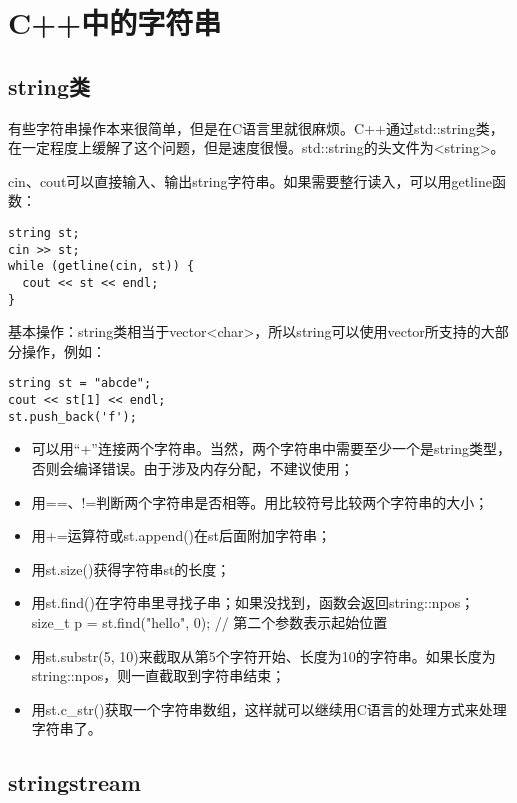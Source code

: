 \section{C++中的字符串}

\subsection{string类}

有些字符串操作本来很简单，但是在C语言里就很麻烦。C++通过std::string类，在一定程度上缓解了这个问题，但是速度很慢。std::string的头文件为<string>。

cin、cout可以直接输入、输出string字符串。如果需要整行读入，可以用getline函数：

\begin{lstlisting}
string st;
cin >> st;
while (getline(cin, st)) {
  cout << st << endl;
}
\end{lstlisting}

基本操作：string类相当于vector<char>，所以string可以使用vector所支持的大部分操作，例如：

\begin{lstlisting}
string st = "abcde";
cout << st[1] << endl;
st.push_back('f');
\end{lstlisting}

\begin{itemize}
  \item 可以用“+”连接两个字符串。当然，两个字符串中需要至少一个是string类型，否则会编译错误。由于涉及内存分配，不建议使用；
  \item 用==、!=判断两个字符串是否相等。用比较符号比较两个字符串的大小；
  \item 用+=运算符或st.append()在st后面附加字符串；
  \item 用st.size()获得字符串st的长度；
  \item 用st.find()在字符串里寻找子串；如果没找到，函数会返回string::npos； \\
        size\_t p = st.find("hello", 0); // 第二个参数表示起始位置
  \item 用st.substr(5, 10)来截取从第5个字符开始、长度为10的字符串。如果长度为string::npos，则一直截取到字符串结束；
  \item 用st.c\_str()获取一个字符串数组，这样就可以继续用C语言的处理方式来处理字符串了。
\end{itemize}

\subsection{stringstream}

